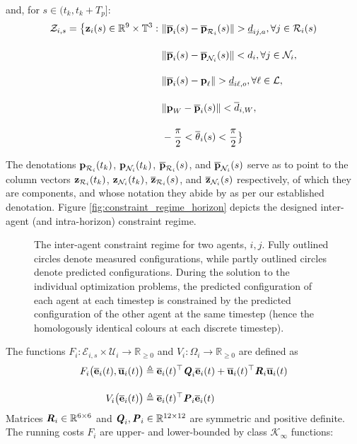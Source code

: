 and, for $s \in (t_k, t_k + T_p]$:
\begin{align}
  \mathcal{Z}_{i,s} = \big\{\bm{\mathbf{z}}_i(s) \in \mathbb{R}^{9}\times \mathbb{T}^3 : \
      & \|\overline{\bm{\mathbf{p}}}_i(s) - \overline{\bm{\mathbf{p}}}_{\mathcal{R}_i}(s)\| > \underline{d}_{ij,a}, \forall j \in \mathcal{R}_i(s)\\[2.5ex]
      & \|\overline{\bm{\mathbf{p}}}_i(s) - \overline{\bm{\mathbf{p}}}_{\mathcal{N}_i}(s)\| < d_i, \forall j \in \mathcal{N}_i, \\[2.5ex]
      & \|\overline{\bm{\mathbf{p}}}_i(s) - \bm{\mathbf{p}}_{\ell}\| > \underline{d}_{i\ell,o}, \forall \ell \in \mathcal{L}, \\[2.5ex]
      & \|\bm{\mathbf{p}}_W - \overline{\bm{\mathbf{p}}}_i(s)\| < \overline{d}_{i,W}, \\[2.5ex]
      & - \frac{\pi}{2} < \overline{\theta}_i(s) < \frac{\pi}{2} \big\}
\end{align}

The denotations $\bm{\mathbf{p}}_{\mathcal{R}_i}(t_k)$, $\bm{\mathbf{p}}_{\mathcal{N}_i}(t_k)$,
$\overline{\bm{\mathbf{p}}}_{\mathcal{R}_i}(s)$, and $\overline{\bm{\mathbf{p}}}_{\mathcal{N}_i}(s)$
serve as to point to the column vectors $\bm{\mathbf{z}}_{\mathcal{R}_i}(t_k)$,
$\bm{\mathbf{z}}_{\mathcal{N}_i}(t_k)$, $\overline{\bm{\mathbf{z}}}_{\mathcal{R}_i}(s)$, and
$\overline{\bm{\mathbf{z}}}_{\mathcal{N}_i}(s)$ respectively, of which they are
components, and whose notation they abide by as per our established denotation.
Figure \eqref{fig:constraint_regime_horizon} depicts the designed inter-agent
(and intra-horizon) constraint regime.\\[2.5ex]

\begin{figure}[ht!]
  \centering
  
  \caption{The inter-agent constraint regime for two agents, $i,j$. Fully
    outlined circles denote measured configurations, while partly outlined
    circles denote predicted configurations. During the solution to the
    individual optimization problems, the predicted configuration of each agent
    at each timestep is constrained by the predicted configuration of the other
    agent at the same timestep (hence the homologously identical colours at
    each discrete timestep).}
  \label{fig:constraint_regime_horizon}
\end{figure}


The functions
$F_i : \mathcal{E}_{i,s} \times \mathcal{U}_i \to \mathbb{R}_{\geq 0}$ and
$V_i: \Omega_i \to \mathbb{R}_{\geq 0}$ are defined as
\begin{align}
  F_i \big(\overline{\bm{\mathbf{e}}}_i(t), \overline{\bm{\mathbf{u}}}_i(t)\big)
    &\triangleq \overline{\bm{\mathbf{e}}}_i(t)^{\top} \bm{\mathit{Q}}_i \overline{\bm{\mathbf{e}}}_i(t)
  + \overline{\bm{\mathbf{u}}}_i(t)^{\top} \bm{\mathit{R}}_i \overline{\bm{\mathbf{u}}}_i(t) \label{eq:F_i_def} \\[2.5ex]
  V_i \big(\overline{\bm{\mathbf{e}}}_i(t)\big) & \triangleq \overline{\bm{\mathbf{e}}}_i(t)^{\top} \bm{\mathit{P}}_i \overline{\bm{\mathbf{e}}}_i(t) \label{eq:V_i_def}
\end{align}
Matrices $\bm{\mathit{R}}_i \in \mathbb{R}^{6 \times 6}$ and
$\bm{\mathit{Q}}_i, \bm{\mathit{P}}_i \in \mathbb{R}^{12 \times 12}$ are symmetric and positive
definite.  The running costs $F_i$ are upper- and lower-bounded by class
$\mathcal{K}_{\infty}$ functions:\\[1ex]

